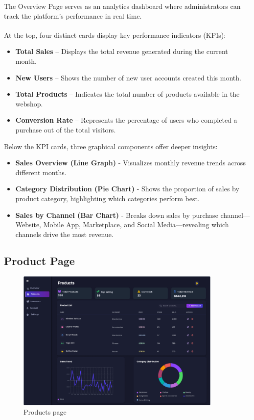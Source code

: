 \documentclass[12pt]{article}
\begin{document}
	\vspace{0.3cm}
	The Overview Page serves as an analytics dashboard where administrators can track the platform’s performance in real time. \\ \\
	At the top, four distinct cards display key performance indicators (KPIs):
	\begin{itemize}
		\item \textbf{Total Sales} – Displays the total revenue generated during the current month.
		\item \textbf{New Users} – Shows the number of new user accounts created this month.
		\item \textbf{Total Products} – Indicates the total number of products available in the webshop.
		\item \textbf{Conversion Rate} – Represents the percentage of users who completed a purchase out of the total visitors.
	\end{itemize}
	Below the KPI cards, three graphical components offer deeper insights:
	\begin{itemize}
		\item \textbf{Sales Overview (Line Graph)} - Visualizes monthly revenue trends across different months.
		\item \textbf{Category Distribution (Pie Chart)} - Shows the proportion of sales by product category, highlighting which categories perform best.
		\item \textbf{Sales by Channel (Bar Chart)} - Breaks down sales by purchase channel—Website, Mobile App, Marketplace, and Social Media—revealing which channels drive the most revenue.
	\end{itemize}

	\newpage
	\subsection{Product Page}\label{subsec:product-page}

	\begin{figure}[h]
		\centering
		\includegraphics[width=0.9\textwidth]{pictures/admin/Products_Admin}
		\caption{Products page}\label{fig:figure2}
	\end{figure}
\end{document}
